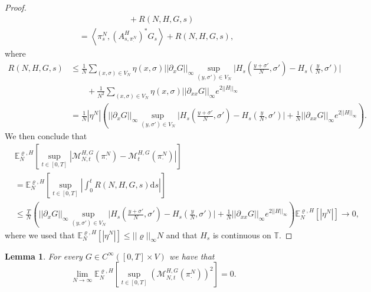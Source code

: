 \documentclass[11pt]{article}
\numberwithin{equation}{section}
\theoremstyle{definition}
\theoremstyle{plain}
\newtheorem{Lemma}[Theorem]{Lemma}
\newcommand{\E}{\mathbb{E}}
\newcommand{\dd}{\mathrm{d}}
\newcommand{\nn}{\nonumber}
\begin{document}
\begin{proof}
\begin{align}
        \nn&\qquad \qquad \qquad + R(N,H, G,s)\\
        &= \left\langle \pi^N_{s}, \left(\!A^{H}_{s, \pi^N_\cdot}\!\right)^{\!*} G_s\right\rangle + R(N,H, G,s),
    \end{align}
where
    \begin{align}
        R(N,H,G,s) 
        \nn&\leq \frac{1}{N} \sum_{(x,\sigma) \in V_N} \eta(x,\sigma)||\partial_xG||_\infty\sup_{(y,\sigma')\in V_N}\big|H_s(\tfrac{y+\sigma'}{N},\sigma') - H_s(\tfrac{y}{N},\sigma')\big| \\
        \nn&\qquad + \frac{1}{N^2} \sum_{(x,\sigma) \in V_N} \eta(x,\sigma)||\partial_{xx}G||_\infty e^{2||H||_\infty}\\
        &= \frac{1}{N} |\eta^N|\left(||\partial_xG||_\infty \sup_{(y,\sigma')\in V_N}\big|H_s(\tfrac{y+\sigma'}{N},\sigma') - H_s(\tfrac{y}{N},\sigma')\big|+ \frac{1}{N}||\partial_{xx}G||_\infty e^{2||H||_\infty}\right).
    \end{align}
We then conclude that  
    \begin{align}\label{R1}
        \nn&\E^{\varrho,H}_N\left[\sup_{t\in[0,T]} \left|\mathscr{M}_{N,t}^{H,G}(\pi^N_{\cdot}) - \mathscr{M}_t^{H,G}(\pi^N_{\cdot})\right|\right] \\
        \nn&= \E^{\varrho,H}_N\left[ \sup_{t\in[0,T]}\left|\int_0^t R(N,H,G,s)\dd s\right| \right]\\
        & \leq \frac{T}{N} \left(||\partial_xG||_\infty\sup_{(y,\sigma')\in V_N}\big|H_s(\tfrac{y+\sigma'}{N},\sigma') - H_s(\tfrac{y}{N},\sigma')\big| + \frac{1}{N}||\partial_{xx}G||_\infty e^{2||H||_\infty}\right)  \E^{\varrho,H}_N\left[|\eta^N|\right] \to 0,
    \end{align}
where we used that $\E^{\varrho,H}_N\left[|\eta^N|\right] \leq ||\varrho||_\infty N$ and that $H_s$ is continuous on $\mathbb{T}$.
\end{proof}
\begin{Lemma}\label{lemma 2.2}
    For every $G \in C^\infty([0,T]\times V)$ we have that 
    \begin{equation}
        \lim_{N\to\infty} \E^{\varrho,H}_N\left[\sup_{t\in[0,T]} \left(\mathscr{M}_{N,t}^{H,G}(\pi^N_{\cdot})\right)^2\right]=0.
    \end{equation}
\end{Lemma}
\end{document}
